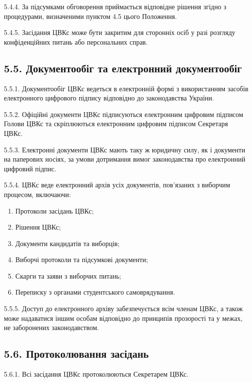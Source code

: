     5.4.4. За підсумками обговорення приймається відповідне рішення згідно з процедурами, визначеними пунктом 4.5 цього Положення.

    5.4.5. Засідання ЦВКс може бути закритим для сторонніх осіб у разі розгляду конфіденційних питань або персональних справ.

\subsection*{5.5. Документообіг та електронний документообіг}
    5.5.1. Документообіг ЦВКс ведеться в електронній формі з використанням засобів електронного цифрового підпису відповідно до законодавства України.

    5.5.2. Офіційні документи ЦВКс підписуються електронним цифровим підписом Голови ЦВКс та скріплюються електронним цифровим підписом Секретаря ЦВКс.

    5.5.3. Електронні документи ЦВКс мають таку ж юридичну силу, як і документи на паперових носіях, за умови дотримання вимог законодавства про електронний цифровий підпис.

    5.5.4. ЦВКс веде електронний архів усіх документів, пов'язаних з виборчим процесом, включаючи:

        \begin{enumerate}[label=\alph*)]
            \item Протоколи засідань ЦВКс;
            \item Рішення ЦВКс;
            \item Документи кандидатів та виборців;
            \item Виборчі протоколи та підсумкові документи;
            \item Скарги та заяви з виборчих питань;
            \item Переписку з органами студентського самоврядування.
        \end{enumerate}

    5.5.5. Доступ до електронного архіву забезпечується всім членам ЦВКс, а також може надаватися іншим особам відповідно до принципів прозорості та у межах, не заборонених законодавством.

\subsection*{5.6. Протоколювання засідань}
    5.6.1. Всі засідання ЦВКс протоколюються Секретарем ЦВКс.

